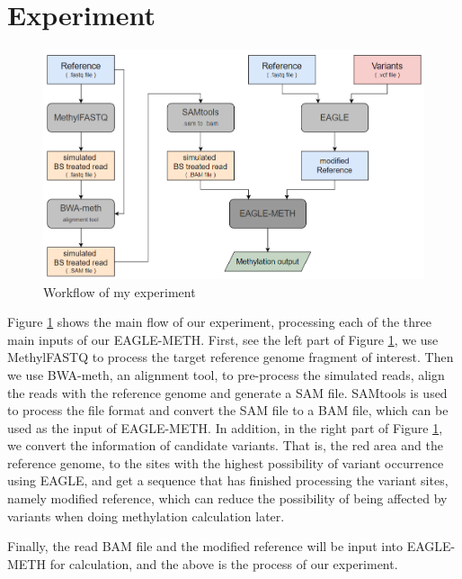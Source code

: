 \documentclass{PHlab-thesis}
\begin{document}
\section{Experiment}
\begin{figure}[h]
  \centering
  \includegraphics[scale=0.8]{figures/experiment_workflow_v2.PNG}
  \caption{Workflow of my experiment}
  \label{fig:exp_Workflow} 
\end{figure}
\par Figure \ref{fig:exp_Workflow} shows the main flow of our experiment, processing each of the three main inputs of our EAGLE-METH. First, see the left part of Figure \ref{fig:exp_Workflow}, we use MethylFASTQ to process the target reference genome fragment of interest. Then we use BWA-meth, an alignment tool, to pre-process the simulated reads, align the reads with the reference genome and generate a SAM file. SAMtools is used to process the file format and convert the SAM file to a BAM file, which can be used as the input of EAGLE-METH. In addition, in the right part of Figure \ref{fig:exp_Workflow}, we convert the information of candidate variants. That is, the red area and the reference genome, to the sites with the highest possibility of variant occurrence using EAGLE, and get a sequence that has finished processing the variant sites, namely modified reference, which can reduce the possibility of being affected by variants when doing methylation calculation later.
\par Finally, the read BAM file and the modified reference will be input into EAGLE-METH for calculation, and the above is the process of our experiment.
\end{document}
